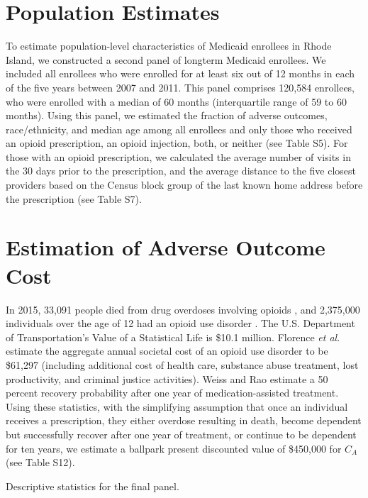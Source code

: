 \documentclass[9pt,twoside]{pnas-new}
\begin{document}
\section{Population Estimates}

To estimate population-level characteristics of Medicaid enrollees in Rhode Island, we constructed a second panel of longterm Medicaid enrollees. We included all enrollees who were enrolled for at least six out of 12 months in each of the five years between 2007 and 2011. This panel comprises 120,584 enrollees, who were enrolled with a median of 60 months (interquartile range of 59 to 60 months). Using this panel, we estimated the fraction of adverse outcomes, race/ethnicity, and median age among all enrollees and only those who received an opioid prescription, an opioid injection, both, or neither (see Table S5). For those with an opioid prescription, we calculated the average number of visits in the 30 days prior to the prescription, and the average distance to the five closest providers based on the Census block group of the last known home address before the prescription (see Table S7).

\section{Estimation of Adverse Outcome Cost}

In 2015, 33,091 people died from drug overdoses involving opioids \cite{nida1}, and 2,375,000 individuals over the age of 12 had an opioid use disorder \cite{cbhsq}. The U.S. Department of Transportation's Value of a Statistical Life is \$10.1 million. Florence \textit{et al}. \cite{florence} estimate the aggregate annual societal cost of an opioid use disorder to be \$61,297 (including additional cost of health care, substance abuse treatment, lost productivity, and criminal justice activities). Weiss and Rao \cite{weiss} estimate a 50 percent recovery probability after one year of medication-assisted treatment. Using these statistics, with the simplifying assumption that once an individual receives a prescription, they either overdose resulting in death, become dependent but successfully recover after one year of treatment, or continue to be dependent for ten years, we estimate a ballpark present discounted value of \$450,000 for $C_A$ (see Table S12).

\footnotesize

\normalsize

\begin{table}
\caption{Descriptive statistics for the final panel.}
\centering

\end{table}
\end{document}
